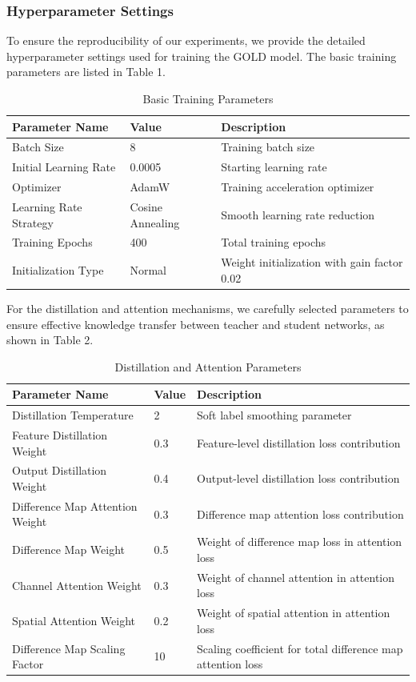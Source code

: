 \documentclass[a4paper,fleqn]{cas-dc}
\begin{document}
\subsubsection{Hyperparameter Settings}
To ensure the reproducibility of our experiments, we provide the detailed hyperparameter settings used for training the GOLD model. The basic training parameters are listed in Table 1.

\begin{table}[htbp]
\centering
\caption{Basic Training Parameters}
\begin{tabular}{lll}
\hline
Parameter Name & Value & Description \\
\hline
Batch Size & 8 & Training batch size \\
Initial Learning Rate & 0.0005 & Starting learning rate \\
Optimizer & AdamW & Training acceleration optimizer \\
Learning Rate Strategy & Cosine Annealing & Smooth learning rate reduction \\
Training Epochs & 400 & Total training epochs \\
Initialization Type & Normal & Weight initialization with gain factor 0.02 \\
\hline
\end{tabular}
\label{tab:basic_params}
\end{table}

For the distillation and attention mechanisms, we carefully selected parameters to ensure effective knowledge transfer between teacher and student networks, as shown in Table 2.

\begin{table}[htbp]
\centering
\caption{Distillation and Attention Parameters}
\begin{tabular}{lll}
\hline
Parameter Name & Value & Description \\
\hline
Distillation Temperature & 2 & Soft label smoothing parameter \\
Feature Distillation Weight & 0.3 & Feature-level distillation loss contribution \\
Output Distillation Weight & 0.4 & Output-level distillation loss contribution \\
Difference Map Attention Weight & 0.3 & Difference map attention loss contribution \\
Difference Map Weight & 0.5 & Weight of difference map loss in attention loss \\
Channel Attention Weight & 0.3 & Weight of channel attention in attention loss \\
Spatial Attention Weight & 0.2 & Weight of spatial attention in attention loss \\
Difference Map Scaling Factor & 10 & Scaling coefficient for total difference map attention loss \\
\hline
\end{tabular}
\label{tab:distillation_params}
\end{table}
\end{document}
